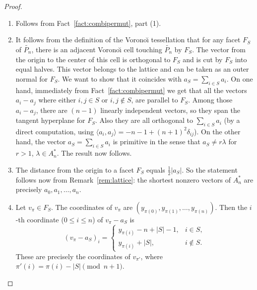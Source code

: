 \documentclass[12pt,a4paper,oneside]{amsart}
\theoremstyle{definition}
\theoremstyle{remark}
\numberwithin{equation}{section}
\begin{document}
\begin{proof}
\begin{enumerate}
\item Follows from Fact~\ref{fact:combipermut}, part (1).
\item It follows from the definition of the Vorono\u{\i} tessellation that for any facet $F_S$ of $\widetilde{P_n}$, there is an adjacent Vorono\u{\i} cell touching $\widetilde{P_n}$ by $F_S$. The vector from the origin to the center of this cell is orthogonal to $F_S$ and is cut by $F_S$ into equal halves. This vector belongs to the lattice and can be taken as an outer normal for $F_S$. We want to show that it coincides with $a_S = \sum\limits_{i \in S} a_i$. On one hand, immediately from Fact~\ref{fact:combipermut} we get that all the vectors $a_i-a_j$ where either $i,j\in S$ or $i,j \notin S$, are parallel to $F_S$. Among those $a_i-a_j$, there are $(n-1)$ linearly independent vectors, so they span the tangent hyperplane for $F_S$. Also they are all orthogonal to $\sum_{i \in S} a_i$ (by a direct computation, using $\langle a_i, a_j\rangle = - n - 1 + (n+1)^2\delta_{ij}$). On the other hand, the vector $a_S = \sum\limits_{i \in S} a_i$ is primitive in the sense that $a_S \neq r\lambda$ for $r > 1$, $\lambda \in A_n^*$. The result now follows.
\item The distance from the origin to a facet $F_S$ equals $\frac12 |a_S|$. So the statement follows now from Remark~\ref{rem:lattice}: the shortest nonzero vectors of $A_n^*$ are precisely $a_0, a_1, \ldots, a_n$.
\item Let $v_\pi \in F_S$. The coordinates of $v_\pi$ are $(y_{\pi(0)}, y_{\pi(1)}, \ldots, y_{\pi(n)})$. Then the $i$-th coordinate ($0 \le i \le n$) of $v_\pi - a_S$ is
$$
(v_\pi - a_S)_i =
\begin{cases}
y_{\pi(i)} - n + |S|-1, & i \in S, \\
y_{\pi(i)} + |S|, & i \notin S.
\end{cases}
$$
These are precisely the coordinates of $v_{\pi'}$, where $\pi'(i) = \pi(i) - |S| \pmod{n+1}$.

\end{enumerate}
\end{proof}
\end{document}
